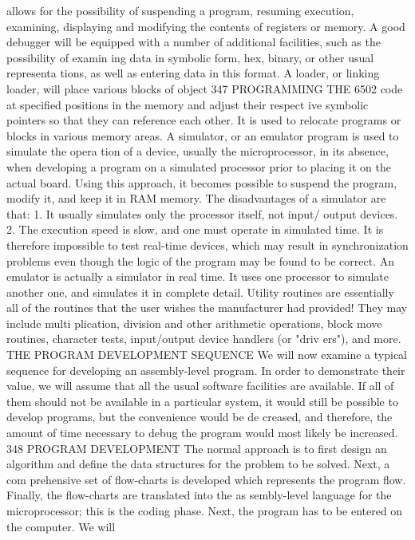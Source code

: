 \documentclass{book}
\begin{document}
{{{{{{{{{{{{{{{{{{{{{{{{{{{{{{{{{{{{{{{{{{{{{{{{{{{{{{{{{{{{{{{{{{{{{{{{{{{{{{{{{{{{{{{{{{{{{{{{{{{{{{{{{{{{{{{{{{{{{{{{{{{{{{{{{{{{{{{{{{{{allows for the possibility of suspending a program, resuming
execution, examining, displaying and modifying the contents of
registers or memory. A good debugger will be equipped with a
number of additional facilities, such as the possibility of examin
ing data in symbolic form, hex, binary, or other usual representa
tions, as well as entering data in this format.
A loader, or linking loader, will place various blocks of object
347
PROGRAMMING THE 6502
code at specified positions in the memory and adjust their respect
ive symbolic pointers so that they can reference each other. It is
used to relocate programs or blocks in various memory areas.
A simulator, or an emulator program is used to simulate the opera
tion of a device, usually the microprocessor, in its absence, when
developing a program on a simulated processor prior to placing it
on the actual board. Using this approach, it becomes possible to suspend
the program, modify it, and keep it in RAM memory. The disadvantages
of a simulator are that:
1. It usually simulates only the processor itself, not input/
output devices.
2. The execution speed is slow, and one must operate in simulated
time. It is therefore impossible to test real-time devices, which may
result in synchronization problems even though the logic of the
program may be found to be correct.
An emulator is actually a simulator in real time. It uses one
processor to simulate another one, and simulates it in complete
detail.
Utility routines are essentially all of the routines that the user
wishes the manufacturer had provided! They may include multi
plication, division and other arithmetic operations, block move
routines, character tests, input/output device handlers (or "driv
ers"), and more.
THE PROGRAM DEVELOPMENT SEQUENCE
We will now examine a typical sequence for developing an
assembly-level program. In order to demonstrate their value, we will
assume that all the usual software facilities are available. If all of
them should not be available in a particular system, it would still be
possible to develop programs, but the convenience would be de
creased, and therefore, the amount of time necessary to debug the
program would most likely be increased.
348
PROGRAM DEVELOPMENT
The normal approach is to first design an algorithm and define
the data structures for the problem to be solved. Next, a com
prehensive set of flow-charts is developed which represents the
program flow. Finally, the flow-charts are translated into the as
sembly-level language for the microprocessor; this is the coding
phase.
Next, the program has to be entered on the computer. We will
}}}}}}}}}}}}}}}}}}}}}}}}}}}}}}}}}}}}}}}}}}}}}}}}}}}}}}}}}}}}}}}}}}}}}}}}}}}}}}}}}}}}}}}}}}}}}}}}}}}}}}}}}}}}}}}}}}}}}}}}}}}}}}}}}}}}}}}}}}}}
\end{document}
